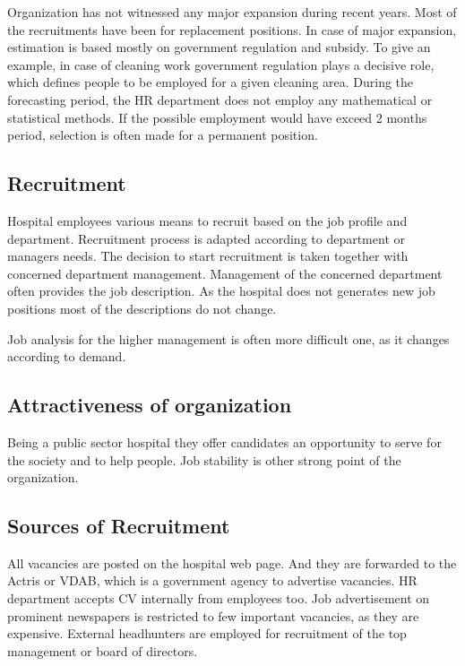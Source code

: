 \documentclass[a4paper,fleqn,11pt,dvips,titlepage]{article}
\numberwithin{figure}{section}
\numberwithin{equation}{section}
\begin{document}
Organization has not witnessed any major expansion during recent years.
Most of the recruitments have been for replacement positions.
In case of major expansion, estimation is based mostly on government regulation and subsidy.
To give an example, in case of cleaning work government regulation plays a decisive role, which defines people to be employed for a given cleaning area.
During the forecasting period, the HR department does not employ any mathematical or statistical methods.
If the possible employment would have exceed 2 months period, selection is often made for a permanent position. 

\subsection{Recruitment}

Hospital employees various means to recruit based on the job profile and department.
Recruitment process is adapted according to department or managers needs.
The decision to start recruitment is taken together with concerned department management.
Management of the concerned department often provides the job description.
As the hospital does not generates new job positions most of the descriptions do not change. 

Job analysis for the higher management is often more difficult one, as it changes according to demand.

\subsection{Attractiveness of organization}

Being a public sector hospital they offer candidates an opportunity to serve for the society and to help people.
Job stability is other strong point of the organization. 


\subsection{Sources of Recruitment}

All vacancies are posted on the hospital web page.
And they are forwarded to the Actris or VDAB, which is a government agency to advertise vacancies.
HR department accepts CV internally from employees too.
Job advertisement on prominent newspapers is restricted to few important vacancies, as they are expensive.
External headhunters are employed for recruitment of the top management or board of directors. 
\end{document}
